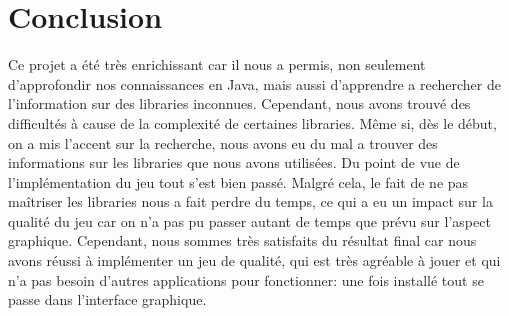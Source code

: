 \section{Conclusion}
\label{sec:conclusion}

Ce projet a été très enrichissant car il nous a permis, non seulement d'approfondir nos connaissances en Java, mais aussi d'apprendre a rechercher
de l'information sur des libraries inconnues. Cependant, nous avons trouvé des difficultés à cause de la complexité de certaines libraries. Même si, dès le
début, on a mis l'accent sur la recherche, nous avons eu du mal a trouver des informations sur les libraries que nous avons utilisées. Du point de vue
de l'implémentation du jeu tout s'est bien passé. Malgré cela, le fait de ne pas maîtriser les libraries nous a fait perdre du temps, ce qui a eu un impact sur la qualité
du jeu car on n'a pas pu passer autant de temps que prévu sur l'aspect graphique. Cependant, nous sommes très satisfaits du résultat final car nous avons
réussi à implémenter un jeu de qualité, qui est très agréable à jouer et qui n'a pas besoin d'autres applications pour fonctionner: une fois installé tout se passe dans
l'interface graphique.

